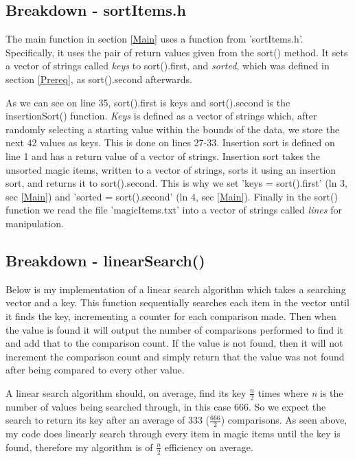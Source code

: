 \documentclass[12pt, letterpaper]{article}
\begin{document}
\subsection{Breakdown - sortItems.h} \label{SrtItm}
The main function in section \ref{Main} uses a function from 'sortItems.h'.
Specifically, it uses the pair of return values given from the sort() method.
It sets a vector of strings called \textit{keys} to sort().first, and \textit{sorted}, which was defined in section \ref{Prereq}, as sort().second afterwards.
\newline

As we can see on line 35, sort().first is keys and sort().second is the insertionSort() function.
\textit{Keys} is defined as a vector of strings which, after randomly selecting a starting value within the bounds of the data, we store the next 42 values as keys.
This is done on lines 27-33.
\newline
\indent Insertion sort is defined on line 1 and has a return value of a vector of strings.
Insertion sort takes the unsorted magic items, written to a vector of strings, sorts it using an insertion sort, and returns it to sort().second.
This is why we set 'keys = sort().first' (ln 3, sec \ref{Main}) and 'sorted = sort().second' (ln 4, sec \ref{Main}).
Finally in the sort() function we read the file 'magicItems.txt' into a vector of strings called \textit{lines} for manipulation.

\subsection{Breakdown - linearSearch()} \label{LinSchCde}
Below is my implementation of a linear search algorithm which takes a searching vector and a key.
This function sequentially searches each item in the vector until it finds the key, incrementing a counter for each comparison made.
Then when the value is found it will output the number of comparisons performed to find it and add that to the comparison count.
\newline
\indent If the value is not found, then it will not increment the comparison count and simply return that the value was not found after being compared to every other value.

A linear search algorithm should, on average, find its key $\frac{n}{2}$ times where \textit{n} is the number of values being searched through, in this case 666.
So we expect the search to return its key after an average of 333 ($\frac{666}{2}$) comparisons.
As seen above, my code does linearly search through every item in magic items until the key is found, therefore my algorithm is of $\frac{n}{2}$ efficiency on average. 
\end{document}

